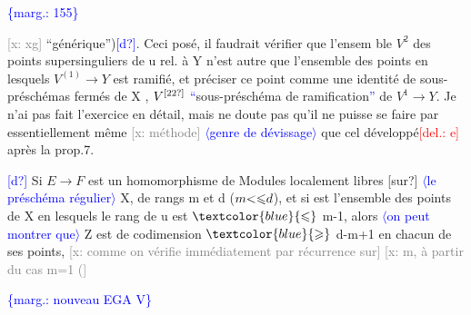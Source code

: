 \documentclass[11pt]{article}
\newcommand{\scanpage}[1]{\par\bigskip\noindent{\small\sffamily[scan #1]}\par}
\newcommand{\mspage}[1]{{\small\sffamily[p.\,#1]}}
\newcommand{\hand}[1]{\textcolor{blue}{#1}}
\let\over\relax
\newcommand{\over}[2]{\textcolor{gray}{#1}\textcolor{blue}{\ensuremath{^{\!\nearrow}}#2}}
\newcommand{\inserted}[2][]{\textcolor{blue}{$\langle$#2$\rangle$}}
\newcommand{\margin}[1]{\textcolor{blue}{\{\textsf{marg.:} #1\}}}
\newcommand{\deleted}[1]{\textcolor{red}{[\textsf{del.:} #1]}}
\newcommand{\xout}[1]{\textcolor{gray}{[\textsf{x:} #1]}}
\newcommand{\unsure}[1]{[#1?]}
\begin{document}
\margin{155}

\clearpage
\scanpage{25/156}
\mspage{\hand{17}}

\xout{xg} ``générique'')\hand{\unsure{d}}.   Ceci posé, il faudrait vérifier que l'ensem ble $V^2$
des points supersinguliers de u rel. à Y n'est autre que l'ensemble des
points en lesquels $V^{(1)} \longrightarrow Y$ est ramifié, et préciser ce point
comme une identité de sous-préschémas fermés de X , $V^{\unsure{\over{2}{2}}}$ \over{=}{=} \hand{``}sous-préschéma
de ramification\hand{''} de $V^1 \longrightarrow Y$. Je n'ai pas fait l'exercice en détail,
mais ne doute pas qu'il ne puisse se faire par essentiellement \over{la}{le} même
\xout{méthode} \inserted{genre de dévissage} que cel\over{le}{ui} développé\deleted{e} après la prop.7.

\hand{\unsure{d}} Si $E \longrightarrow F$ est un homomorphisme de Modules localement libres \unsure{sur} \inserted{le préschéma régulier}
X, de rangs m et d ($m \over{<}{\leqslant} d$), et si \over{\unsure{Y}}{Z} est l'ensemble des points de X en
lesquels le rang de u est $\hand{\leqslant}$ m-1, alors \inserted{on peut montrer que} Z est de codimension $\hand{\geqslant}$ d-m+1
en chacun de ses points, \xout{comme on vérifie immédiatement par récurrence sur}
\xout{m, à partir du cas m=1 (}

\mspage{\hand{156}}

\clearpage
\scanpage{25/157}
\mspage{\hand{157}}

\clearpage
\scanpage{25/158}
\margin{nouveau EGA V} \mspage{1}
\end{document}
